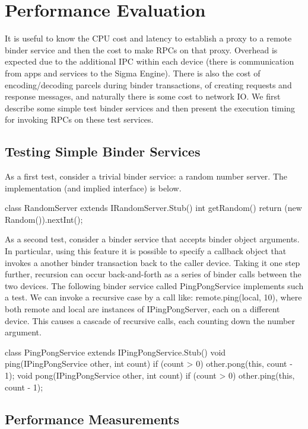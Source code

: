 \documentclass[prodmode]{acmlarge}
\begin{document}
\section{Performance Evaluation}
\label{sec:Performance}
It is useful to know the CPU cost and latency to establish a proxy to a remote binder service and then the cost to make RPCs on that proxy. Overhead is expected due to the additional IPC within each device (there is communication from apps and services to the Sigma Engine). There is also the cost of encoding/decoding parcels during binder transactions, of creating requests and response messages, and naturally there is some cost to network IO. We first describe some simple test binder services and then present the execution timing for invoking RPCs on these test services.

\subsection{Testing Simple Binder Services}
As a first test, consider a trivial binder service: a random number server. The implementation (and implied interface) is below.

\begin{snippet}
class RandomServer extends IRandomServer.Stub() {
  int getRandom() { return (new Random()).nextInt(); }}
\end{snippet}

As a second test, consider a binder service that accepts binder object arguments. In particular, using this feature it is possible to specify a callback object that invokes a another binder transaction back to the caller device. Taking it one step further, recursion can occur back-and-forth as a series of binder calls between the two devices. The following binder service called PingPongService implements such a test. We can invoke a recursive case by a call like: remote.ping(local, 10), where both remote and local are instances of IPingPongServer, each on a different device. This causes a cascade of recursive calls, each counting down the number argument.

\begin{snippet}
class PingPongService extends
    IPingPongService.Stub() {
  void ping(IPingPongService other, int count) {
    if (count > 0) other.pong(this, count - 1);
  }
  void pong(IPingPongService other, int count) {
    if (count > 0) other.ping(this, count - 1);
  }
}
\end{snippet}

\subsection{Performance Measurements}
\end{document}
